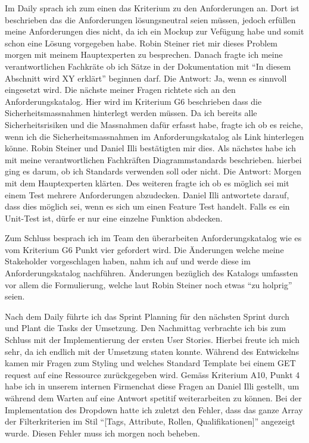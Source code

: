 Im Daily sprach ich zum einen das Kriterium zu den Anforderungen an. Dort ist beschrieben das die Anforderungen lösungsneutral seien müssen, jedoch
erfüllen meine Anforderungen dies nicht, da ich ein Mockup zur Vefügung habe und somit schon eine Lösung vorgegeben habe. Robin Steiner
riet mir dieses Problem morgen mit meinem Hauptexperten zu besprechen. Danach fragte ich meine verantwortlichen Fachkräte ob ich Sätze in der Dokumentation
mit ``In diesem Abschnitt wird XY erklärt'' beginnen darf. Die Antwort: Ja, wenn es sinnvoll eingesetzt wird. Die nächste meiner Fragen richtete sich an den 
Anforderungskatalog. Hier wird im Kriterium G6 beschrieben dass die Sicherheitsmassnahmen hinterlegt werden müssen.
Da ich bereits alle Sicherheitsrisiken und die Massnahmen dafür erfasst habe, fragte ich ob es reiche, wenn ich die Sicherheitsmassnahmen im Anforderungskatalog als
Link hinterlegen könne. Robin Steiner und Daniel Illi bestätigten mir dies. Als nächstes habe ich mit meine verantwortlichen Fachkräften Diagrammstandards beschrieben.
hierbei ging es darum, ob ich Standards verwenden soll oder nicht. Die Antwort: Morgen mit dem Hauptexperten klärten.
Des weiteren fragte ich ob es möglich sei mit einem Test mehrere Anforderungen abzudecken. Daniel Illi antwortete darauf, dass
dies möglich sei, wenn es sich um einen Feature Test handelt. Falls es ein Unit-Test ist, dürfe er nur eine einzelne Funktion abdecken. 

Zum Schluss besprach ich im Team den überarbeiten Anforderungskatalog wie es vom Kriterium G6 Punkt vier gefordert wird. Die Änderungen welche meine Stakeholder 
vorgeschlagen haben, nahm ich auf und werde diese im Anforderungskatalog nachführen. Änderungen bezüglich des Katalogs umfassten vor allem die Formulierung,
welche laut Robin Steiner noch etwas ``zu holprig'' seien.

Nach dem Daily führte ich das Sprint Planning für den nächsten Sprint durch und Plant die Tasks der Umsetzung.
Den Nachmittag verbrachte ich bis zum Schluss mit der Implementierung der ersten User Stories. Hierbei freute ich mich sehr, da 
ich endlich mit der Umsetzung staten konnte. Während des Entwickelns kamen mir Fragen zum Styling und welches Standard Template bei einem 
GET request auf eine Ressource zurückgegeben wird. Gemäss Kriterium A10, Punkt 4 habe ich in unserem internen Firmenchat diese Fragen an Daniel Illi gestellt,
um während dem Warten auf eine Antwort spetitif weiterarbeiten zu können. Bei der Implementation des Dropdown hatte ich zuletzt den Fehler, 
dass das ganze Array der Filterkriterien im Stil ``[Tags, Attribute, Rollen, Qualifikationen]'' angezeigt wurde. Diesen Fehler muss ich morgen noch beheben.

